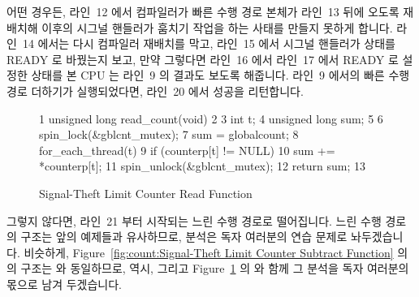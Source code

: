 어떤 경우든, 라인~12 에서 컴파일러가 빠른 수행 경로 본체가 라인~13 뒤에 오도록
재배치해 이후의 시그널 핸들러가 훔치기 작업을 하는 사태를 만들지 못하게 합니다.
라인~14 에서는 다시 컴파일러 재배치를 막고, 라인~15 에서 시그널 핸들러가
 상태를 READY 로 바꿨는지 보고, 만약 그렇다면 라인~16 에서 라인~17
에서 READY 로 설정한 상태를 본 CPU 는 라인~9 의 결과도 보도록 해줍니다.
라인~9 에서의 빠른 수행 경로 더하기가 실행되었다면, 라인~20 에서 성공을
리턴합니다.

\begin{figure}[tbp]
{ \scriptsize
\begin{verbbox}
  1 unsigned long read_count(void)
  2 {
  3   int t;
  4   unsigned long sum;
  5 
  6   spin_lock(&gblcnt_mutex);
  7   sum = globalcount;
  8   for_each_thread(t)
  9     if (counterp[t] != NULL)
 10       sum += *counterp[t];
 11   spin_unlock(&gblcnt_mutex);
 12   return sum;
 13 }
\end{verbbox}
}
\centering
\theverbbox
\caption{Signal-Theft Limit Counter Read Function}
\label{fig:count:Signal-Theft Limit Counter Read Function}
\end{figure}

그렇지 않다면, 라인~21 부터 시작되는 느린 수행 경로로 떨어집니다.
느린 수행 경로의 구조는 앞의 예제들과 유사하므로, 분석은 독자 여러분의 연습
문제로 놔두겠습니다.
비슷하게, Figure~\ref{fig:count:Signal-Theft Limit Counter Subtract Function}
의  의 구조는  와 동일하므로, 
역시, 그리고 Figure~\ref{fig:count:Signal-Theft Limit Counter Read Function} 의
 와 함께 그 분석을 독자 여러분의 몫으로 남겨 두겠습니다.

